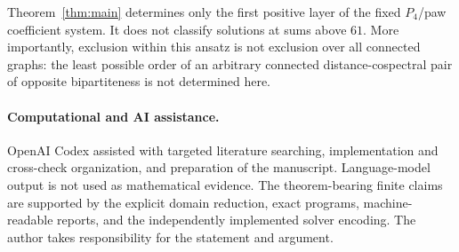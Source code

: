 \documentclass[11pt]{article}
\newcommand{\Pfour}{P_4}
\begin{document}
Theorem~\ref{thm:main} determines only the first positive layer of the fixed
$\Pfour$/paw coefficient system.  It does not classify solutions at sums
above $61$.  More importantly, exclusion within this ansatz is not exclusion
over all connected graphs: the least possible order of an arbitrary connected
distance-cospectral pair of opposite bipartiteness is not determined here.

\paragraph{Computational and AI assistance.}
OpenAI Codex assisted with targeted literature searching, implementation and
cross-check organization, and preparation of the manuscript.  Language-model
output is not used as mathematical evidence.  The theorem-bearing finite
claims are supported by the explicit domain reduction, exact programs,
machine-readable reports, and the independently implemented solver encoding.
The author takes responsibility for the statement and argument.



\end{document}
